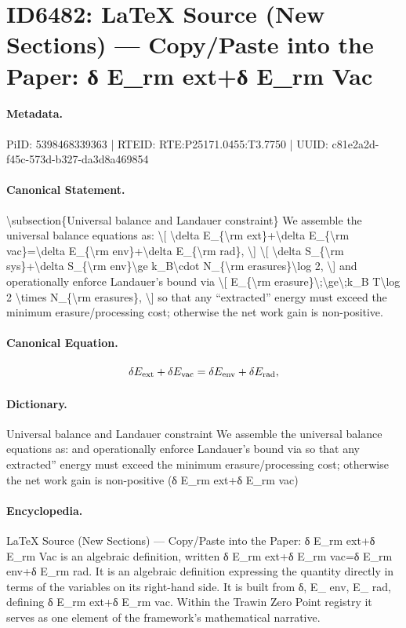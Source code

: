 \section*{ID6482: LaTeX Source (New Sections) — Copy/Paste into the Paper: δ E\_rm ext+δ E\_rm Vac}
\paragraph{Metadata.}
PiID: 5398468339363 | RTEID: RTE:P25171.0455:T3.7750 | UUID: c81e2a2d-f45c-573d-b327-da3d8a469854

\paragraph{Canonical Statement.}
\textbackslash{}subsection\{Universal balance and Landauer constraint\} We assemble the universal balance equations as: \textbackslash{}[ \textbackslash{}delta E\_\{\textbackslash{}rm ext\}+\textbackslash{}delta E\_\{\textbackslash{}rm vac\}=\textbackslash{}delta E\_\{\textbackslash{}rm env\}+\textbackslash{}delta E\_\{\textbackslash{}rm rad\}, \textbackslash{}] \textbackslash{}[ \textbackslash{}delta S\_\{\textbackslash{}rm sys\}+\textbackslash{}delta S\_\{\textbackslash{}rm env\}\textbackslash{}ge k\_B\textbackslash{}cdot N\_\{\textbackslash{}rm erasures\}\textbackslash{}log 2, \textbackslash{}] and operationally enforce Landauer's bound via \textbackslash{}[ E\_\{\textbackslash{}rm erasure\}\textbackslash{};\textbackslash{}ge\textbackslash{};k\_B T\textbackslash{}log 2 \textbackslash{}times N\_\{\textbackslash{}rm erasures\}, \textbackslash{}] so that any ``extracted'' energy must exceed the minimum erasure/processing cost; otherwise the net work gain is non-positive.

\paragraph{Canonical Equation.}
\[
\delta E_{\rm ext}+\delta E_{\rm vac}=\delta E_{\rm env}+\delta E_{\rm rad},
\]

\paragraph{Dictionary.}
Universal balance and Landauer constraint We assemble the universal balance equations as: and operationally enforce Landauer's bound via so that any extracted'' energy must exceed the minimum erasure/processing cost; otherwise the net work gain is non-positive (δ E\_rm ext+δ E\_rm vac)

\paragraph{Encyclopedia.}
LaTeX Source (New Sections) — Copy/Paste into the Paper: δ E\_rm ext+δ E\_rm Vac is an algebraic definition, written δ E\_rm ext+δ E\_rm vac=δ E\_rm env+δ E\_rm rad. It is an algebraic definition expressing the quantity directly in terms of the variables on its right-hand side. It is built from δ, E\_ env, E\_ rad, defining δ E\_rm ext+δ E\_rm vac. Within the Trawin Zero Point registry it serves as one element of the framework's mathematical narrative.
